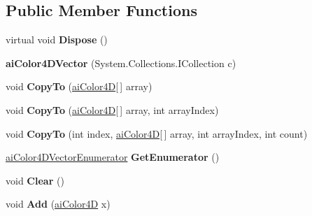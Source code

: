 \subsection*{Public Member Functions}
\begin{DoxyCompactItemize}
\item 
\hypertarget{classai_color4_d_vector_afa24a341178cd907050a6bebe0a6359c}{virtual void {\bfseries Dispose} ()}\label{classai_color4_d_vector_afa24a341178cd907050a6bebe0a6359c}

\item 
\hypertarget{classai_color4_d_vector_a177967ad7d7674bcbb189e5f222e4a78}{{\bfseries ai\+Color4\+D\+Vector} (System.\+Collections.\+I\+Collection c)}\label{classai_color4_d_vector_a177967ad7d7674bcbb189e5f222e4a78}

\item 
\hypertarget{classai_color4_d_vector_a5969fe01cfb222be0b69282758a13c9f}{void {\bfseries Copy\+To} (\hyperlink{structai_color4_d}{ai\+Color4\+D}\mbox{[}$\,$\mbox{]} array)}\label{classai_color4_d_vector_a5969fe01cfb222be0b69282758a13c9f}

\item 
\hypertarget{classai_color4_d_vector_a61837fc4a9dc58913a6dfd6e9ae80f18}{void {\bfseries Copy\+To} (\hyperlink{structai_color4_d}{ai\+Color4\+D}\mbox{[}$\,$\mbox{]} array, int array\+Index)}\label{classai_color4_d_vector_a61837fc4a9dc58913a6dfd6e9ae80f18}

\item 
\hypertarget{classai_color4_d_vector_aafc460d4c0d065464f9e286fbd646cc4}{void {\bfseries Copy\+To} (int index, \hyperlink{structai_color4_d}{ai\+Color4\+D}\mbox{[}$\,$\mbox{]} array, int array\+Index, int count)}\label{classai_color4_d_vector_aafc460d4c0d065464f9e286fbd646cc4}

\item 
\hypertarget{classai_color4_d_vector_a56bdebfd9e7574d72430701610010576}{\hyperlink{classai_color4_d_vector_1_1ai_color4_d_vector_enumerator}{ai\+Color4\+D\+Vector\+Enumerator} {\bfseries Get\+Enumerator} ()}\label{classai_color4_d_vector_a56bdebfd9e7574d72430701610010576}

\item 
\hypertarget{classai_color4_d_vector_acfd18bae7d39ba02bc5e6eefdd9f9459}{void {\bfseries Clear} ()}\label{classai_color4_d_vector_acfd18bae7d39ba02bc5e6eefdd9f9459}

\item 
\hypertarget{classai_color4_d_vector_af6e09260852612cd313d7c3ecfb4ebcd}{void {\bfseries Add} (\hyperlink{structai_color4_d}{ai\+Color4\+D} x)}\label{classai_color4_d_vector_af6e09260852612cd313d7c3ecfb4ebcd}


\end{DoxyCompactItemize}
